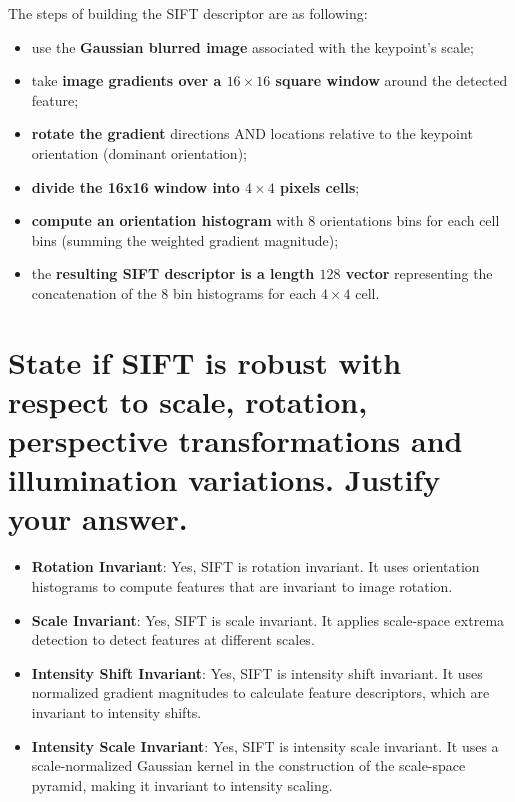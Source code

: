 \documentclass{article}
\begin{document}
The steps of building the SIFT descriptor are as following:

\begin{itemize}
    \item use the \textbf{Gaussian blurred image} associated with the keypoint's scale;
    \item take \textbf{image gradients over a $16\times16$ square window} around the detected feature;
    \item \textbf{rotate the gradient} directions AND locations relative to the keypoint orientation (dominant orientation);
    \item \textbf{divide the 16x16 window into $4\times4$ pixels cells};
    \item \textbf{compute an orientation histogram} with $8$ orientations bins for each cell bins (summing the weighted gradient magnitude);
    \item the \textbf{resulting SIFT descriptor is a length $128$ vector} representing the concatenation of the $8$ bin histograms for each $4\times4$ cell.
\end{itemize}

\newpage

\section{State if SIFT is robust with respect to scale, rotation, perspective transformations and illumination variations. Justify your answer.}

\begin{itemize}
    \item \textbf{Rotation Invariant}: Yes, SIFT is rotation invariant. It uses orientation histograms to compute features that are invariant to image rotation.
    \item \textbf{Scale Invariant}: Yes, SIFT is scale invariant. It applies scale-space extrema detection to detect features at different scales.
    \item \textbf{Intensity Shift Invariant}: Yes, SIFT is intensity shift invariant. It uses normalized gradient magnitudes to calculate feature descriptors, which are invariant to intensity shifts.
    \item \textbf{Intensity Scale Invariant}: Yes, SIFT is intensity scale invariant. It uses a scale-normalized Gaussian kernel in the construction of the scale-space pyramid, making it invariant to intensity scaling.
\end{itemize}
\end{document}

